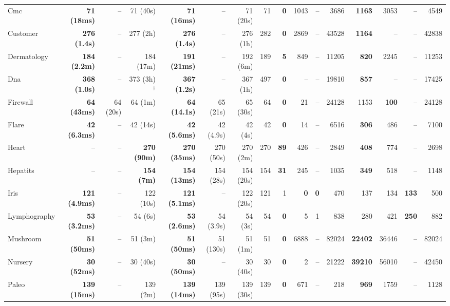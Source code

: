 \begin{table}[h]
\begin{tabular}{l rrr rrr r rrrr rrrr}
Cmc & \textbf{71 (18ms)} & -- & 71 (40s) & \textbf{71 (16ms)} & -- & 71 (20s) & 71 & \textbf{0} & 1043 & -- & 3686 & \textbf{1163} & 3053 & -- & 4549 \\
Customer & \textbf{276 (1.4s)} & -- & 277 (2h) & \textbf{276 (1.4s)} & -- & 276 (1h) & 282 & \textbf{0} & 2869 & -- & 43528 & \textbf{1164} & -- & -- & 42838 \\
Dermatology & \textbf{184 (2.2m)} & -- & 184 (17m) & \textbf{191 (21ms)} & -- & 192 (6m) & 189 & \textbf{5} & 849 & -- & 11205 & \textbf{820} & 2245 & -- & 11253 \\
Dna & \textbf{368 (1.0s)} & -- & 373 (3h)${}^{\dagger}$ & \textbf{367 (1.2s)} & -- & 367 (1h) & 497 & \textbf{0} & -- & -- & 19810 & \textbf{857} & -- & -- & 17425 \\
Firewall & \textbf{64 (43ms)} & 64 (20s) & 64 (1m) & \textbf{64 (14.1s)} & 65 (21s) & 65 (30s) & 64 & \textbf{0} & 21 & -- & 24128 & 1153 & \textbf{100} & -- & 24128 \\
Flare & \textbf{42 (6.3ms)} & -- & 42 (14s) & \textbf{42 (5.6ms)} & 42 (4.9s) & 42 (4s) & 42 & \textbf{0} & 14 & -- & 6516 & \textbf{306} & 486 & -- & 7100 \\
Heart & -- & -- & \textbf{270 (90m)} & \textbf{270 (35ms)} & 270 (50s) & 270 (2m) & 270 & \textbf{89} & 426 & -- & 2849 & \textbf{408} & 774 & -- & 2698 \\
Hepatits & -- & -- & \textbf{154 (7m)} & \textbf{154 (13ms)} & 154 (28s) & 154 (20s) & 154 & \textbf{31} & 245 & -- & 1035 & \textbf{349} & 518 & -- & 1148 \\
Iris & \textbf{121 (4.9ms)} & -- & 122 (10s) & \textbf{121 (5.1ms)} & -- & 122 (20s) & 121 & 1 & \textbf{0} & \textbf{0} & 470 & 137 & 134 & \textbf{133} & 500 \\
Lymphography & \textbf{53 (3.2ms)} & -- & 54 (6s) & \textbf{53 (2.6ms)} & 54 (3.9s) & 54 (3s) & 54 & \textbf{0} & 5 & 1 & 838 & 280 & 421 & \textbf{250} & 882 \\
Mushroom & \textbf{51 (50ms)} & -- & 51 (3m) & \textbf{51 (50ms)} & 51 (130s) & 51 (1m) & 51 & \textbf{0} & 6888 & -- & 82024 & \textbf{22402} & 36446 & -- & 82024 \\
Nursery & \textbf{30 (52ms)} & -- & 30 (40s) & \textbf{30 (50ms)} & -- & 30 (40s) & 30 & \textbf{0} & 2 & -- & 21222 & \textbf{39210} & 56010 & -- & 42450 \\
Paleo & \textbf{139 (15ms)} & -- & 139 (2m) & \textbf{139 (14ms)} & 139 (95s) & 139 (30s) & 139 & \textbf{0} & 671 & -- & 218 & \textbf{969} & 1759 & -- & 1128 \\

\end{tabular}
\end{table}
